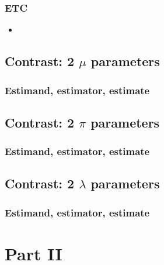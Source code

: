 \documentclass[]{book}
\begin{document}
\hypertarget{etc-1}{%
\section{ETC}\label{etc-1}}

\begin{itemize}
\item
\end{itemize}

\hypertarget{contrast2Muparas}{%
\chapter{\texorpdfstring{Contrast: 2 \(\mu\) parameters}{Contrast: 2 \textbackslash{}mu parameters}}\label{contrast2Muparas}}

\hypertarget{estimand-estimator-estimate}{%
\section{Estimand, estimator, estimate}\label{estimand-estimator-estimate}}

\hypertarget{contrast2Piparas}{%
\chapter{\texorpdfstring{Contrast: 2 \(\pi\) parameters}{Contrast: 2 \textbackslash{}pi parameters}}\label{contrast2Piparas}}

\hypertarget{estimand-estimator-estimate-1}{%
\section{Estimand, estimator, estimate}\label{estimand-estimator-estimate-1}}

\hypertarget{contrast2Lambdaparas}{%
\chapter{\texorpdfstring{Contrast: 2 \(\lambda\) parameters}{Contrast: 2 \textbackslash{}lambda parameters}}\label{contrast2Lambdaparas}}

\hypertarget{estimand-estimator-estimate-2}{%
\section{Estimand, estimator, estimate}\label{estimand-estimator-estimate-2}}

\hypertarget{part-part-ii}{%
\part{Part II}\label{part-part-ii}}
\end{document}
